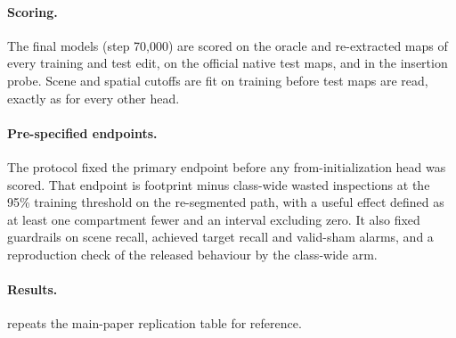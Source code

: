 \paragraph{Scoring.} The final models (step 70{,}000) are scored on the oracle and re-extracted maps of every training and test edit, on the official native test maps, and in the insertion probe. Scene and spatial cutoffs are fit on training before test maps are read, exactly as for every other head.
\paragraph{Pre-specified endpoints.} The protocol fixed the primary endpoint before any from-initialization head was scored. That endpoint is footprint minus class-wide wasted inspections at the 95\% training threshold on the re-segmented path, with a useful effect defined as at least one compartment fewer and an interval excluding zero. It also fixed guardrails on scene recall, achieved target recall and valid-sham alarms, and a reproduction check of the released behaviour by the class-wide arm. \scratchEndpoints
\paragraph{Results.}  repeats the main-paper replication table for reference.
\begin{table}[t]
\centering
\caption{Training from initialization (main Tab.~2, repeated for reference).}
\label{tab:replication_supp}
\small

\end{table}
